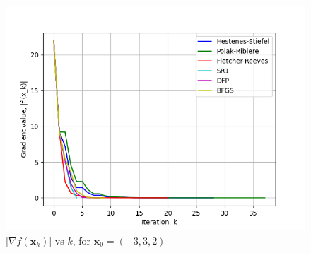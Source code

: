\documentclass[a4paper]{article}
\begin{document}
\begin{figure}[H]
    \centering
    \includegraphics[width=.65\textwidth]{images/hyperellipsoid_function_grad.png}
    \caption{$|\nabla f(\textbf{x}_k)|$ vs $k$, for $\textbf{x}_0 = (-3, 3, 2)$}
\end{figure}
\end{document}
